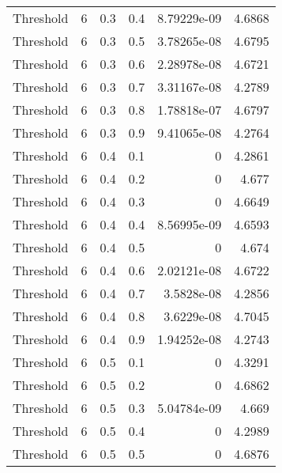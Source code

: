 \documentclass{article}
\begin{document}
\begin{longtable}[H]{lrrrrr}
 Threshold      &       6 &   0.3 &            0.4 &      8.79229e-09 &          4.6868 \\
 Threshold      &       6 &   0.3 &            0.5 &      3.78265e-08 &          4.6795 \\
 Threshold      &       6 &   0.3 &            0.6 &      2.28978e-08 &          4.6721 \\
 Threshold      &       6 &   0.3 &            0.7 &      3.31167e-08 &          4.2789 \\
 Threshold      &       6 &   0.3 &            0.8 &      1.78818e-07 &          4.6797 \\
 Threshold      &       6 &   0.3 &            0.9 &      9.41065e-08 &          4.2764 \\
 Threshold      &       6 &   0.4 &            0.1 &      0           &          4.2861 \\
 Threshold      &       6 &   0.4 &            0.2 &      0           &          4.677  \\
 Threshold      &       6 &   0.4 &            0.3 &      0           &          4.6649 \\
 Threshold      &       6 &   0.4 &            0.4 &      8.56995e-09 &          4.6593 \\
 Threshold      &       6 &   0.4 &            0.5 &      0           &          4.674  \\
 Threshold      &       6 &   0.4 &            0.6 &      2.02121e-08 &          4.6722 \\
 Threshold      &       6 &   0.4 &            0.7 &      3.5828e-08  &          4.2856 \\
 Threshold      &       6 &   0.4 &            0.8 &      3.6229e-08  &          4.7045 \\
 Threshold      &       6 &   0.4 &            0.9 &      1.94252e-08 &          4.2743 \\
 Threshold      &       6 &   0.5 &            0.1 &      0           &          4.3291 \\
 Threshold      &       6 &   0.5 &            0.2 &      0           &          4.6862 \\
 Threshold      &       6 &   0.5 &            0.3 &      5.04784e-09 &          4.669  \\
 Threshold      &       6 &   0.5 &            0.4 &      0           &          4.2989 \\
 Threshold      &       6 &   0.5 &            0.5 &      0           &          4.6876 \\

\end{longtable}
\end{document}
